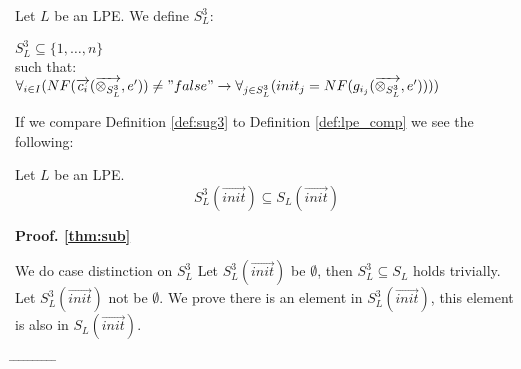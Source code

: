 \documentclass[a4paper,10pt]{article}
\theoremstyle{plain}
\theoremstyle{definition}
\newcommand{\ovr}{\overrightarrow}
\newcommand{\tb}{\textbf}
\begin{document}
\begin{defn} \label{def:sug3} Let $L$ be an LPE. We define $S_L^3$:

\begin{flushleft}
$ S_L^3 \subseteq \lbrace 1, \ldots, n \rbrace $ \\

such that:\\

$\forall_{i \in I} (NF( \ovr{c_i} ( \ovr{\otimes_{S_L^3}}, e' ) ) \not= "false" \rightarrow \forall_{j \in S_L^3}(init_j =  NF( g_{i_j}(\ovr{\otimes_{S_L^3}}, e' )))) $
\end{flushleft}
If we compare Definition \ref{def:sug3} to Definition \ref{def:lpe_comp} we see the following:
\begin{thm} Let $L$ be an LPE. \label{thm:sub}
$$S_L^3(\ovr{init}) \subseteq S_L(\ovr{init}) $$
\end{thm} 
\begin{flushleft}
\tb{Proof. \ref{thm:sub}}
\end{flushleft}
We do case distinction on $S_L^3$
Let $S_L^3(\ovr{init})$ be $\emptyset$, then $S_L^3 \subseteq S_L$ holds trivially.%
\newpage
Let $S_L^3(\ovr{init})$ not be $\emptyset$. We prove there is an element in $S_L^3(\ovr{init})$, this element is also in $S_L(\ovr{init})$.
\begin{tabbing}
\hspace*{5.mm} \= \hspace*{5.mm} \= \hspace*{5.mm} \= \hspace*{5.mm} \= \hspace*{5.mm} \= \hspace*{5.mm}  \= \hspace*{5.mm}  \= \hspace*{5.mm}  \= \hspace*{5.mm} \= \hspace*{5.mm} \= \hspace*{5.mm}\kill

\end{tabbing}
\end{defn}
\end{document}
